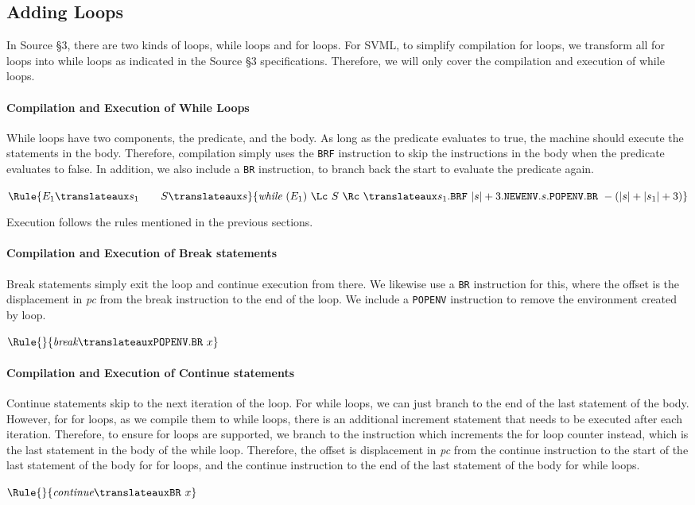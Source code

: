 \subsection{Adding Loops}

In Source §3, there are two kinds of loops, while loops and for loops.
For SVML, to simplify compilation for loops, we transform all for loops into while loops as
indicated in the Source §3 specifications. Therefore, we will only cover
the compilation and execution of while loops.

\paragraph{Compilation and Execution of While Loops}
While loops have two components, the predicate, and the body. As long as the
predicate evaluates to true, the machine should execute the statements in the body.
Therefore, compilation simply uses the \texttt{BRF} instruction to skip
the instructions in the body when the predicate evaluates to false.
In addition, we also include a \texttt{BR} instruction, to branch back
the start to evaluate the predicate again.

$\Rule{
E_1 \translateaux s_1 \qquad S \translateaux s}
{\textit{while}\ (E_1)\ \Lc\ S\ \Rc\ \translateaux s_1
.\texttt{BRF}\ |s|+3.\texttt{NEWENV}.s.\texttt{POPENV}
.\texttt{BR}\ -(|s|+|s_1|+3)}
$

Execution follows the rules mentioned in the previous sections.

\paragraph{Compilation and Execution of Break statements}
Break statements simply exit the loop and continue execution from there.
We likewise use a \texttt{BR} instruction for this, where the offset
is the displacement in \textit{pc} from the break instruction to the end
of the loop. We include a
\texttt{POPENV} instruction to remove the environment created by loop.

$\Rule{}
{\textit{break} \translateaux \texttt{POPENV}.\texttt{BR}\ x}
$

\paragraph{Compilation and Execution of Continue statements}
Continue statements skip to the next iteration of the loop. For while loops,
we can just branch to the end of the last statement of the body. However, for
for loops, as we compile them to while loops, there is an additional
increment statement that needs to be executed after each iteration. Therefore,
to ensure for loops are supported, we branch to the instruction which increments
the for loop counter instead, which is the last statement in the body of the while loop.
Therefore, the offset is displacement in \textit{pc} from the
continue instruction to the start of the last statement of the body for for loops,
and the continue instruction to the end of the last statement of the body for while loops.

$\Rule{}
{\textit{continue} \translateaux \texttt{BR}\ x}
$